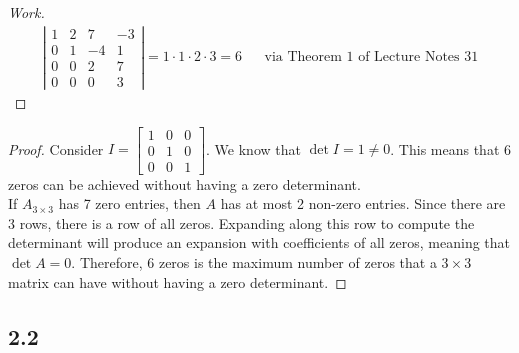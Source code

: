 \documentclass{article}
\begin{document}
\begin{proof}[Work]
  \begin{align*}
    \left\lvert \begin{array}{cccc}
                  1 & 2 & 7  & -3 \\
                  0 & 1 & -4 & 1  \\
                  0 & 0 & 2  & 7  \\
                  0 & 0 & 0  & 3
                \end{array} \right\rvert = 1 \cdot 1 \cdot 2 \cdot 3 = 6 &  & \text{via Theorem 1 of Lecture Notes 31}
  \end{align*}
\end{proof}
\qdash

\begin{proof}
  Consider $I = \begin{bmatrix}
      1 & 0 & 0 \\
      0 & 1 & 0 \\
      0 & 0 & 1
    \end{bmatrix}$.
  We know that $\det I = 1 \neq 0$. This means that 6 zeros can be achieved without having a zero determinant. \\
  If $A_{3 \times 3}$ has 7 zero entries, then $A$ has at most 2 non-zero entries. Since there are 3 rows, there is a row of all zeros. Expanding along this row to compute the determinant will produce an expansion with coefficients of all zeros, meaning that $\det A = 0$. Therefore, 6 zeros is the maximum number of zeros that a  $3 \times 3$ matrix can have without having a zero determinant.
\end{proof}
\qdash

\subsection*{2.2}
\end{document}
